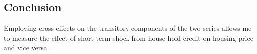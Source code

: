 \documentclass[fleqn]{article}
\begin{document}
\begin{outline}[enumerate]
%

\clearpage
\section{Conclusion}
Employing cross effects on the transitory components of the two series allows me to measure the effect of short term shock from house hold credit on housing price and vice versa.  


\end{outline}
\end{document}
